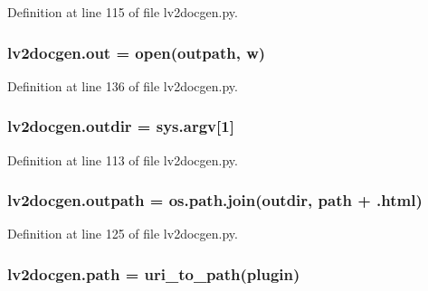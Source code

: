 Definition at line 115 of file lv2docgen.\+py.

\subsubsection[{\texorpdfstring{out}{out}}]{\setlength{\rightskip}{0pt plus 5cm}lv2docgen.\+out = open({\bf outpath}, \textquotesingle{}w\textquotesingle{})}\hypertarget{namespacelv2docgen_ae4bfb5380ca9e3e62abd97fe801aab94}{}\label{namespacelv2docgen_ae4bfb5380ca9e3e62abd97fe801aab94}


Definition at line 136 of file lv2docgen.\+py.

\subsubsection[{\texorpdfstring{outdir}{outdir}}]{\setlength{\rightskip}{0pt plus 5cm}lv2docgen.\+outdir = {\bf sys.\+argv}\mbox{[}1\mbox{]}}\hypertarget{namespacelv2docgen_aac93b4f696d4d83b93b68db08de2a9e0}{}\label{namespacelv2docgen_aac93b4f696d4d83b93b68db08de2a9e0}


Definition at line 113 of file lv2docgen.\+py.

\subsubsection[{\texorpdfstring{outpath}{outpath}}]{\setlength{\rightskip}{0pt plus 5cm}lv2docgen.\+outpath = os.\+path.\+join({\bf outdir}, {\bf path} + \textquotesingle{}.{\bf html}\textquotesingle{})}\hypertarget{namespacelv2docgen_a59e093b7cb6f5f76bd9a728ba1494191}{}\label{namespacelv2docgen_a59e093b7cb6f5f76bd9a728ba1494191}


Definition at line 125 of file lv2docgen.\+py.

\subsubsection[{\texorpdfstring{path}{path}}]{\setlength{\rightskip}{0pt plus 5cm}lv2docgen.\+path = {\bf uri\+\_\+to\+\_\+path}({\bf plugin})}\hypertarget{namespacelv2docgen_ae75d75173fc2ea012acad7d886aa2f9d}{}\label{namespacelv2docgen_ae75d75173fc2ea012acad7d886aa2f9d}


